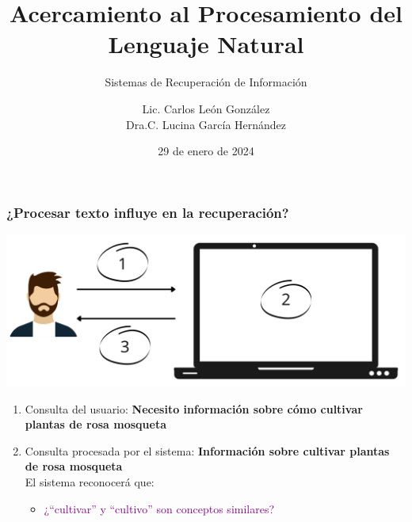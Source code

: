 \documentclass[
10pt, %
aspectratio=169, %
]{beamer}
\title[Short Title]{Acercamiento al Procesamiento del Lenguaje Natural}
\subtitle{Sistemas de Recuperación de Información}
\author{Lic. Carlos León González \\ Dra.C. Lucina García Hernández}
\institute[UC]{Facultad de Matem\'atica y Computaci\'on \\ Universidad de La Habana \\ \smallskip }
\date{29 de enero de  2024} %
\begin{document}
	
	
	
	\begin{frame}
		\titlepage
	\end{frame}
	
	
	\begin{frame}
		
		\frametitle{¿Procesar texto influye en la recuperación?}
		
		\centering
		\includegraphics[scale=0.3]{motivacion.png} 
		
		
		\begin{enumerate}
			
			\pause
			\item Consulta del usuario: \textbf{Necesito información sobre cómo cultivar plantas de rosa mosqueta}
			
			\vspace{1\baselineskip}
			\pause 
			\item Consulta procesada por el sistema: \textbf{Información sobre cultivar plantas de rosa mosqueta} \\ 
			
			\pause
			\vspace{1\baselineskip}
			El sistema reconocerá que:
			
			\begin{itemize}
				\item \textcolor{purple}{¿``cultivar'' y ``cultivo'' son conceptos similares?}
				

\end{itemize}
\end{enumerate}
\end{frame}
\end{document}
